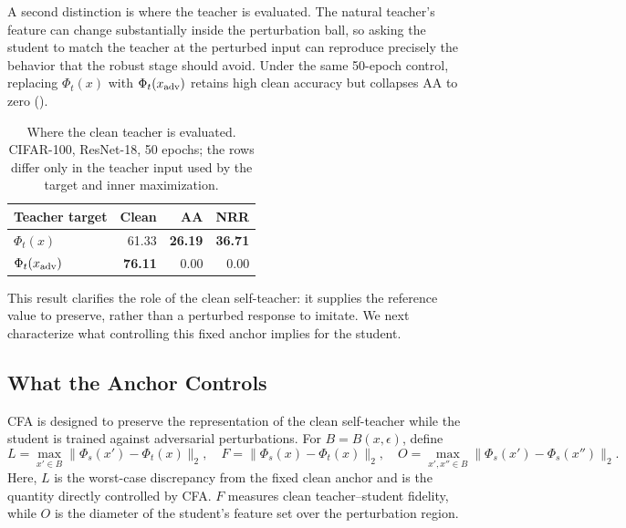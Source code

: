 \documentclass{article} %
\theoremstyle{plain}
\begin{document}
A second distinction is where the teacher is evaluated. The natural teacher's
feature can change substantially inside the perturbation ball, so asking the
student to match the teacher at the perturbed input can reproduce precisely
the behavior that the robust stage should avoid. Under the same 50-epoch
control, replacing \(\Phi_t(x)\) with \(\Phi_t(x_{\rm adv})\) retains high
clean accuracy but collapses AA to zero ().

\begin{table}[t]
  \centering\small\setlength{\tabcolsep}{5pt}
  \caption{Where the clean teacher is evaluated. CIFAR-100, ResNet-18,
  50 epochs; the rows differ only in the teacher input used by the target and
  inner maximization.}
  \label{tab:teacherread}
  \begin{tabular}{lrrr}
    \toprule
    Teacher target & Clean & AA & NRR \\
    \midrule
    \(\Phi_t(x)\) & 61.33 & \textbf{26.19} & \textbf{36.71} \\
    \(\Phi_t(x_{\rm adv})\) & \textbf{76.11} & 0.00 & 0.00 \\
    \bottomrule
  \end{tabular}
\end{table}

This result clarifies the role of the clean self-teacher: it supplies the
reference value to preserve, rather than a perturbed response to imitate. We
next characterize what controlling this fixed anchor implies for the student.

\subsection{What the Anchor Controls}
\label{sec:decomp}

CFA is designed to preserve the representation of the clean self-teacher while
the student is trained against adversarial perturbations. For
\(B=B(x,\epsilon)\), define
\begin{equation}
L=\max_{x'\in B}\|\Phi_s(x')-\Phi_t(x)\|_2,\quad
F=\|\Phi_s(x)-\Phi_t(x)\|_2,\quad
O=\max_{x',x''\in B}\|\Phi_s(x')-\Phi_s(x'')\|_2.
\label{eqn:LFO}
\end{equation}
Here, \(L\) is the worst-case discrepancy from the fixed clean anchor and is
the quantity directly controlled by CFA. \(F\) measures clean
teacher--student fidelity, while \(O\) is the diameter of the student's
feature set over the perturbation region.
\end{document}
